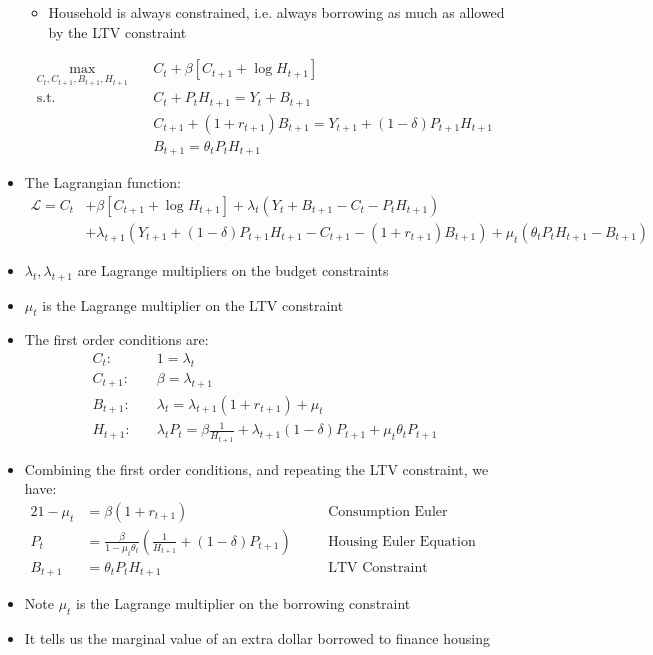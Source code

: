 \documentclass[a4paper,twoside]{article}
\numberwithin{equation}{section}
\numberwithin{figure}{section}
\begin{document}
\begin{itemize}
\begin{itemize}
			\item Household is always constrained, i.e. always borrowing as much as allowed by the LTV constraint
		\end{itemize}
		\begin{align*}
			\max_{C_t,C_{t+1},B_{t+1},H_{t+1}}\quad &C_t + \beta[C_{t+1} + \log H_{t+1}]\\
			\text{s.t.}\quad &C_t + P_t H_{t+1} = Y_t + B_{t+1}\\
			&C_{t+1} + (1+r_{t+1})B_{t+1} = Y_{t+1} + (1-\delta)P_{t+1}H_{t+1}\\
			&B_{t+1} = \theta_tP_tH_{t+1}
		\end{align*}
		\item The Lagrangian function:
		\begin{align*}
			\mathcal{L} = C_t &+ \beta[C_{t+1} + \log H_{t+1}] + \lambda_t(Y_t + B_{t+1} - C_t - P_t H_{t+1})\\ 
			&+ \lambda_{t+1}(Y_{t+1} + (1-\delta)P_{t+1}H_{t+1} - C_{t+1} - (1+r_{t+1})B_{t+1}) + \mu_t(\theta_tP_tH_{t+1} - B_{t+1})
		\end{align*}
		\item \( \lambda_t,\lambda_{t+1} \) are Lagrange multipliers on the budget constraints
		\item \( \mu_t \) is the Lagrange multiplier on the LTV constraint
		\item The first order conditions are:
		\begin{align*}
			C_t:& \quad1=\lambda_t\\
			C_{t+1}:& \quad\beta=\lambda_{t+1}\\
			B_{t+1}:& \quad\lambda_t=\lambda_{t+1}(1+r_{t+1})+\mu_t\\
			H_{t+1}:& \quad\lambda_tP_t=\beta\frac{1}{H_{t+1}}+\lambda_{t+1}(1-\delta)P_{t+1}+\mu_t\theta_tP_{t+1}
		\end{align*}
		\item Combining the first order conditions, and repeating the LTV constraint, we have:
		\begin{alignat*}{2}
			1-\mu_t&=\beta(1+r_{t+1}) &&\text{Consumption Euler Equation}\\
			P_t&=\frac{\beta}{1-\mu_t\theta_t}\left( \frac{1}{H_{t+1}} + (1-\delta)P_{t+1} \right)\quad &&\text{Housing Euler Equation}\\
			B_{t+1}&=\theta_tP_tH_{t+1} &&\text{LTV Constraint}
		\end{alignat*}
		\item Note \( \mu_t \) is the Lagrange multiplier on the borrowing constraint
		\item It tells us the marginal value of an extra dollar borrowed to finance housing
	\end{itemize}
\end{document}

